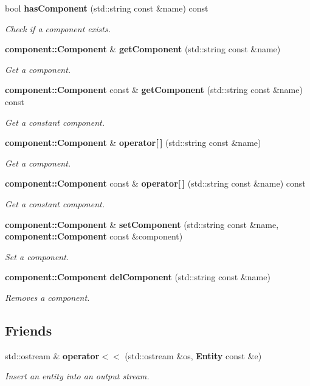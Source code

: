 \begin{DoxyCompactItemize}
bool {\bf has\+Component} (std\+::string const \&name) const
\begin{DoxyCompactList}\small\item\em Check if a component exists. \end{DoxyCompactList}\item 
{\bf component\+::\+Component} \& {\bf get\+Component} (std\+::string const \&name)
\begin{DoxyCompactList}\small\item\em Get a component. \end{DoxyCompactList}\item 
{\bf component\+::\+Component} const  \& {\bf get\+Component} (std\+::string const \&name) const
\begin{DoxyCompactList}\small\item\em Get a constant component. \end{DoxyCompactList}\item 
{\bf component\+::\+Component} \& {\bf operator[$\,$]} (std\+::string const \&name)
\begin{DoxyCompactList}\small\item\em Get a component. \end{DoxyCompactList}\item 
{\bf component\+::\+Component} const  \& {\bf operator[$\,$]} (std\+::string const \&name) const
\begin{DoxyCompactList}\small\item\em Get a constant component. \end{DoxyCompactList}\item 
{\bf component\+::\+Component} \& {\bf set\+Component} (std\+::string const \&name, {\bf component\+::\+Component} const \&component)
\begin{DoxyCompactList}\small\item\em Set a component. \end{DoxyCompactList}\item 
{\bf component\+::\+Component} {\bf del\+Component} (std\+::string const \&name)
\begin{DoxyCompactList}\small\item\em Removes a component. \end{DoxyCompactList}\end{DoxyCompactItemize}
\subsection*{Friends}
\begin{DoxyCompactItemize}
\item 
std\+::ostream \& {\bf operator$<$$<$} (std\+::ostream \&os, {\bf Entity} const \&e)
\begin{DoxyCompactList}\small\item\em Insert an entity into an output stream. \end{DoxyCompactList}\end{DoxyCompactItemize}


